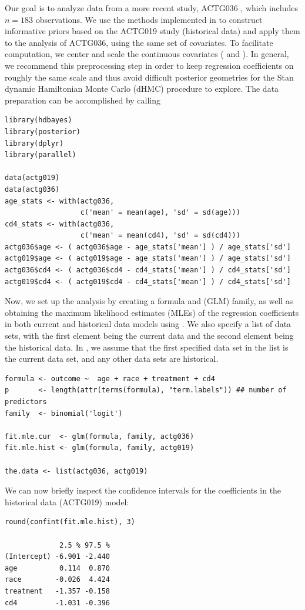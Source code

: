 Our goal is to analyze data from a more recent study, ACTG036 \citep{Merigan1991}, which includes $n=183$ observations. We use the methods implemented in  to construct informative priors based on the ACTG019 study (historical data) and apply them to the analysis of ACTG036, using the same set of covariates. To facilitate computation, we center and scale the continuous covariates ( and ).
In general, we recommend this preprocessing step in order to keep regression coefficients on roughly the same scale and thus avoid difficult posterior geometries for the Stan dynamic Hamiltonian Monte Carlo (dHMC) procedure to explore.
The data preparation can be accomplished by calling
\begin{verbatim}
library(hdbayes)
library(posterior)
library(dplyr)
library(parallel)

data(actg019)
data(actg036)
age_stats <- with(actg036,
                  c('mean' = mean(age), 'sd' = sd(age)))
cd4_stats <- with(actg036,
                  c('mean' = mean(cd4), 'sd' = sd(cd4)))
actg036$age <- ( actg036$age - age_stats['mean'] ) / age_stats['sd']
actg019$age <- ( actg019$age - age_stats['mean'] ) / age_stats['sd']
actg036$cd4 <- ( actg036$cd4 - cd4_stats['mean'] ) / cd4_stats['sd']
actg019$cd4 <- ( actg019$cd4 - cd4_stats['mean'] ) / cd4_stats['sd']

\end{verbatim}
Now, we set up the analysis by creating a formula and (GLM) family, as well as obtaining the maximum likelihood estimates (MLEs) of the regression coefficients in both current and historical data models using . We also specify a list of data sets, with the first element being the current data and the second element being the historical data. In , we assume that the first specified data set in the list is the current data set, and any other data sets are historical.
\begin{verbatim}
formula <- outcome ~  age + race + treatment + cd4
p       <- length(attr(terms(formula), "term.labels")) ## number of predictors
family  <- binomial('logit')

fit.mle.cur  <- glm(formula, family, actg036)
fit.mle.hist <- glm(formula, family, actg019)

the.data <- list(actg036, actg019)
\end{verbatim}
We can now briefly inspect the confidence intervals for the coefficients in the historical data (ACTG019) model:
\begin{verbatim}
round(confint(fit.mle.hist), 3)

             2.5 % 97.5 %
(Intercept) -6.901 -2.440
age          0.114  0.870
race        -0.026  4.424
treatment   -1.357 -0.158
cd4         -1.031 -0.396
\end{verbatim}
